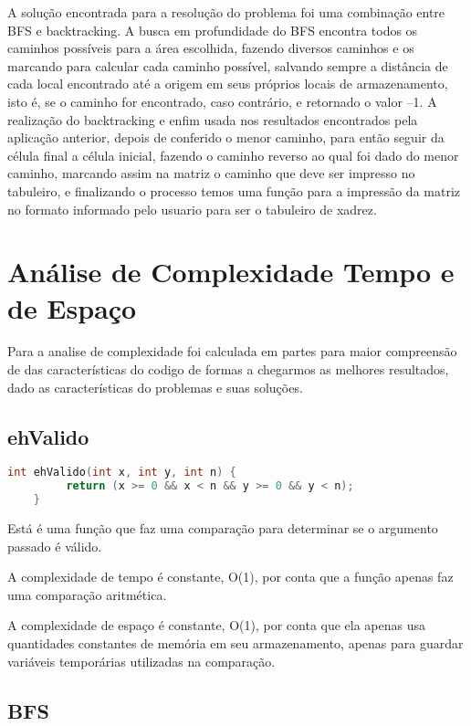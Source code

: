 \documentclass[relatorio]{IEEEtran}
\begin{document}
A solução encontrada para a resolução do problema foi uma combinação entre BFS e backtracking. A busca em profundidade do BFS encontra todos os caminhos possíveis para a área escolhida, fazendo diversos caminhos e os marcando para calcular cada caminho possível, salvando sempre a distância de cada local encontrado até a origem em seus próprios locais de armazenamento, isto é, se o caminho for encontrado, caso contrário, e retornado o valor –1. A realização do backtracking e enfim usada nos resultados encontrados pela aplicação anterior, depois de conferido o menor caminho, para então seguir da célula final a célula inicial, fazendo o caminho reverso ao qual foi dado do menor caminho, marcando assim na matriz o caminho que deve ser impresso no tabuleiro, e finalizando o processo temos uma função para a impressão da matriz no formato informado pelo usuario para ser o tabuleiro de xadrez.

\section{Análise de Complexidade Tempo e de Espaço}
Para a analise de complexidade foi calculada em partes para maior compreensão de das características do codigo de formas a chegarmos as melhores resultados, dado as características do problemas e suas soluções.
\subsection{ehValido}
\begin{lstlisting}[language=C]
    int ehValido(int x, int y, int n) {
         return (x >= 0 && x < n && y >= 0 && y < n);
    }    
\end{lstlisting}

Está é uma função que faz uma comparação para determinar se o argumento passado é válido.

A complexidade de tempo é constante, O(1), por conta que a função apenas faz uma comparação aritmética.

A complexidade de espaço é constante, O(1), por conta que ela apenas usa quantidades constantes de memória em seu armazenamento, apenas para guardar variáveis temporárias utilizadas na comparação.

\subsection{BFS}
\end{document}

